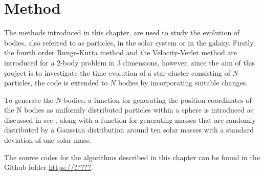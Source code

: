 \chapter{Method}
\label{chap:method} 
The methods introduced in this chapter, are used to study the evolution of bodies, also referred to as particles, in the solar system or in the galaxy. 
Firstly, the fourth order Runge-Kutta method and the Velocity-Verlet method are introduced for a 2-body problem in 3 dimensions, however, since the aim of this project is to investigate the time evolution of a star cluster consisting of $N$ particles, the code is extended to $N$ bodies by incorporating suitable changes. 

To generate the $N$ bodies, a function for generating the position coordinates of the N bodies as uniformly distributed particles within a sphere is introduced as discussed in sec , along with a function for generating masses that are randomly distributed by a Gaussian distribution around ten solar masses with a standard deviation of one solar mass.

The source codes for the algorithms described in this chapter can be found in the Github folder \url{https://?????}.  

